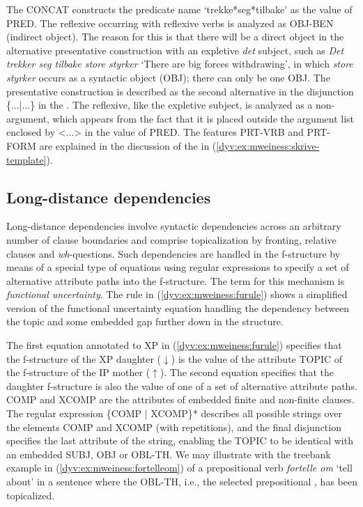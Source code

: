 \documentclass[output=paper]{langsci/langscibook}
\begin{document}
The  CONCAT constructs the predicate name `trekke*seg*tilbake' as the value of PRED.
The reflexive occurring with reflexive verbs is analyzed as OBJ-BEN (indirect object).
The reason for this is that there will be a direct object in the alternative presentative construction with an expletive \textit{det} subject, such as \textit{Det trekker seg tilbake store styrker} `There are big forces withdrawing', in which \textit{store styrker} occurs as a syntactic object (OBJ); there can only be one OBJ.
The presentative construction is described as the second alternative in the disjunction \{...|...\} in the .
The reflexive, like the expletive subject, is analyzed as a non-argument, which appears from the fact that it is placed outside the argument list enclosed by <...> in the value of PRED.
The features PRT-VRB and PRT-FORM are explained in the discussion of the  in (\ref{dyv:ex:mweiness:skrive-template}).

\subsection{Long-distance dependencies}\label{dyv:sec:mweiness:longdist}

Long-distance dependencies involve syntactic dependencies across an arbitrary number of clause boundaries and comprise topicalization by fronting, relative clauses and \textit{wh}-questions.
Such dependencies are handled in the f-structure by means of a special type of equations using regular expressions to specify a set of alternative attribute paths into the f-structure.
The term for this mechanism is \emph{functional uncertainty}.
The rule in (\ref{dyv:ex:mweiness:furule}) shows a simplified version of the functional uncertainty equation handling the dependency between the topic and some embedded gap further down in the structure.


The first equation annotated to XP in (\ref{dyv:ex:mweiness:furule}) specifies that the f-structure of the XP daughter ($\downarrow$) is the value of the attribute TOPIC of the f-structure of the IP mother ($\uparrow$).
The second equation specifies that the daughter f-structure is also the value of one of a set of alternative attribute paths.
COMP and XCOMP are the attributes of embedded finite and non-finite clauses.
The regular expression \{COMP | XCOMP\}* describes all possible strings over the elements COMP and XCOMP (with repetitions), and the final disjunction specifies the last attribute of the string, enabling the TOPIC to be identical with an embedded SUBJ, OBJ or OBL-TH.
We may illustrate with the treebank example in (\ref{dyv:ex:mweiness:fortelleom}) of a prepositional verb \textit{fortelle om} `tell about' in a sentence where the OBL-TH, i.e., the selected prepositional , has been topicalized.
\end{document}
